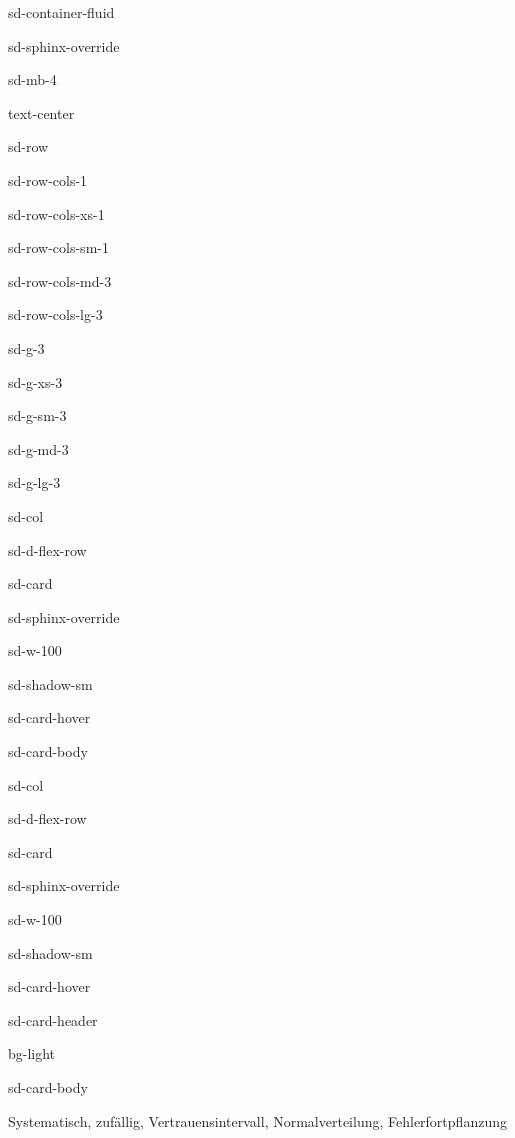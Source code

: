 \documentclass[letterpaper,10pt,english]{jupyterBook}
\let\sphinxpxdimen\pdfpxdimen\else\newdimen\sphinxpxdimen
\begin{document}
\begin{sphinxuseclass}{sd-container-fluid}
\begin{sphinxuseclass}{sd-sphinx-override}
\begin{sphinxuseclass}{sd-mb-4}
\begin{sphinxuseclass}{text-center}
\begin{sphinxuseclass}{sd-row}
\begin{sphinxuseclass}{sd-row-cols-1}
\begin{sphinxuseclass}{sd-row-cols-xs-1}
\begin{sphinxuseclass}{sd-row-cols-sm-1}
\begin{sphinxuseclass}{sd-row-cols-md-3}
\begin{sphinxuseclass}{sd-row-cols-lg-3}
\begin{sphinxuseclass}{sd-g-3}
\begin{sphinxuseclass}{sd-g-xs-3}
\begin{sphinxuseclass}{sd-g-sm-3}
\begin{sphinxuseclass}{sd-g-md-3}
\begin{sphinxuseclass}{sd-g-lg-3}
\begin{sphinxuseclass}{sd-col}
\begin{sphinxuseclass}{sd-d-flex-row}
\begin{sphinxuseclass}{sd-card}
\begin{sphinxuseclass}{sd-sphinx-override}
\begin{sphinxuseclass}{sd-w-100}
\begin{sphinxuseclass}{sd-shadow-sm}
\begin{sphinxuseclass}{sd-card-hover}
\begin{sphinxuseclass}{sd-card-body}
\end{sphinxuseclass}{\hyperref[\detokenize{content/1_Messen_Einheit::doc}]{}}
\end{sphinxuseclass}
\end{sphinxuseclass}
\end{sphinxuseclass}
\end{sphinxuseclass}
\end{sphinxuseclass}
\end{sphinxuseclass}
\end{sphinxuseclass}
\begin{sphinxuseclass}{sd-col}
\begin{sphinxuseclass}{sd-d-flex-row}
\begin{sphinxuseclass}{sd-card}
\begin{sphinxuseclass}{sd-sphinx-override}
\begin{sphinxuseclass}{sd-w-100}
\begin{sphinxuseclass}{sd-shadow-sm}
\begin{sphinxuseclass}{sd-card-hover}
\begin{sphinxuseclass}{sd-card-header}
\begin{sphinxuseclass}{bg-light}
\sphinxAtStartPar
{}

\end{sphinxuseclass}
\end{sphinxuseclass}
\begin{sphinxuseclass}{sd-card-body}
\noindent\sphinxincludegraphics[height=120\sphinxpxdimen]{{abweichung}.png}

\sphinxAtStartPar
Systematisch, zufällig, Vertrauensintervall, Normalverteilung, Fehlerfortpflanzung


\end{sphinxuseclass}
\end{sphinxuseclass}
\end{sphinxuseclass}
\end{sphinxuseclass}
\end{sphinxuseclass}
\end{sphinxuseclass}
\end{sphinxuseclass}
\end{sphinxuseclass}
\end{sphinxuseclass}
\end{sphinxuseclass}
\end{sphinxuseclass}
\end{sphinxuseclass}
\end{sphinxuseclass}
\end{sphinxuseclass}
\end{sphinxuseclass}
\end{sphinxuseclass}
\end{sphinxuseclass}
\end{sphinxuseclass}
\end{sphinxuseclass}
\end{sphinxuseclass}
\end{sphinxuseclass}
\end{sphinxuseclass}
\end{sphinxuseclass}
\end{document}
